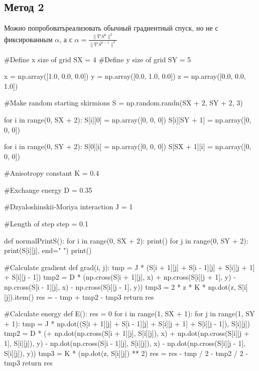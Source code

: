 \documentclass[ 12pt,x11names]{article}
\begin{document}
 \subsection{Метод 2}
 Можно попробоватьреализовать обычный градиентный спуск, но не с фиксированным $\alpha$, а с $\alpha = \frac{\| \nabla S^k \|^2}{\| \nabla S^{k-1} \|^2}$\\
  \begin{python}
#Define  x size of grid
SX = 4
#Define y size of grid
SY = 5

x = np.array([1.0, 0.0, 0.0])
y = np.array([0.0, 1.0, 0.0])
z = np.array([0.0, 0.0, 1.0])

#Make random starting skirmions
S = np.random.randn(SX + 2, SY + 2, 3)

for i in range(0, SX + 2):
    S[i][0] = np.array([0, 0, 0])
    S[i][SY + 1] = np.array([0, 0, 0])

for i in range(0, SY + 2):
    S[0][i] = np.array([0, 0, 0])
    S[SX + 1][i] = np.array([0, 0, 0])

#Anisotropy constant
K = 0.4

#Exchange energy
D = 0.35

#Dzyaloshinskii-Moriya interaction
J = 1

#Length of step
step = 0.1

def normalPrintS():
    for i in range(0, SX + 2):
        print()
        for j in range(0, SY + 2):
            print(S[i][j], end=" ")
    print()

#Calculate gradient
def grad(i, j):
    tmp = J * (S[i + 1][j] + S[i - 1][j] +
               S[i][j + 1] + S[i][j - 1])
    tmp2 = D * (np.cross(S[i + 1][j], x) +
                np.cross(S[i][j + 1], y) -
                np.cross(S[i - 1][j], x) -
                np.cross(S[i][j - 1], y))
    tmp3 = 2 * z * K * np.dot(z, S[i][j]).item()
    res = - tmp + tmp2 - tmp3
    return res

#Calculate energy
def E():
    res = 0
    for i in range(1, SX + 1):
        for j in range(1, SY + 1):
            tmp = J * np.dot((S[i + 1][j] +
            S[i - 1][j] + S[i][j + 1] + S[i][j - 1]), S[i][j])
            tmp2 = D * (+ np.dot(np.cross(S[i + 1][j], S[i][j]), x)
                        + np.dot(np.cross(S[i][j + 1], S[i][j]), y)
                        - np.dot(np.cross(S[i - 1][j], S[i][j]), x)
                        - np.dot(np.cross(S[i][j - 1], S[i][j]), y))
            tmp3 = K * (np.dot(z, S[i][j]) ** 2)
            res = res - tmp / 2 - tmp2 / 2 - tmp3
    return res


\end{python}
\end{document}
